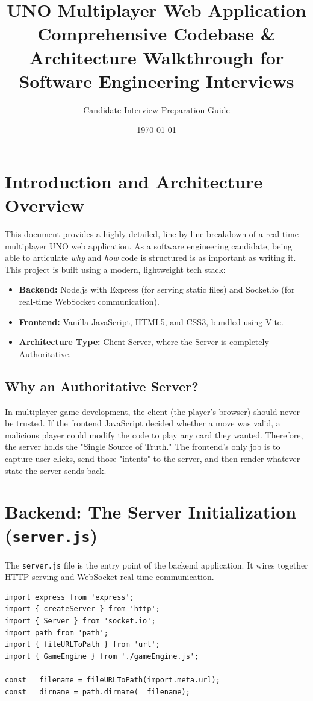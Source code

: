 \documentclass[11pt,a4paper]{article}
\title{\textbf{UNO Multiplayer Web Application}\\ \Large Comprehensive Codebase \& Architecture Walkthrough for Software Engineering Interviews}
\author{Candidate Interview Preparation Guide}
\date{\today}
\begin{document}
\maketitle
\tableofcontents
\newpage

\section{Introduction and Architecture Overview}

This document provides a highly detailed, line-by-line breakdown of a real-time multiplayer UNO web application. As a software engineering candidate, being able to articulate \textit{why} and \textit{how} code is structured is as important as writing it. This project is built using a modern, lightweight tech stack:

\begin{itemize}
    \item \textbf{Backend:} Node.js with Express (for serving static files) and Socket.io (for real-time WebSocket communication).
    \item \textbf{Frontend:} Vanilla JavaScript, HTML5, and CSS3, bundled using Vite.
    \item \textbf{Architecture Type:} Client-Server, where the Server is completely Authoritative.
\end{itemize}

\subsection{Why an Authoritative Server?}
In multiplayer game development, the client (the player's browser) should never be trusted. If the frontend JavaScript decided whether a move was valid, a malicious player could modify the code to play any card they wanted. Therefore, the server holds the "Single Source of Truth." The frontend's only job is to capture user clicks, send those "intents" to the server, and then render whatever state the server sends back.

\section{Backend: The Server Initialization (\texttt{server.js})}
The \texttt{server.js} file is the entry point of the backend application. It wires together HTTP serving and WebSocket real-time communication.

\begin{verbatim}
import express from 'express';
import { createServer } from 'http';
import { Server } from 'socket.io';
import path from 'path';
import { fileURLToPath } from 'url';
import { GameEngine } from './gameEngine.js';

const __filename = fileURLToPath(import.meta.url);
const __dirname = path.dirname(__filename);
\end{verbatim}
\end{document}
